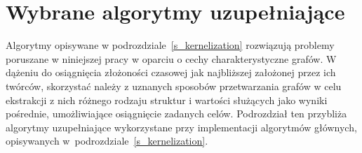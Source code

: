 \section{Wybrane algorytmy uzupełniające}\label{s_supplementary_algorithms}
\par{
  Algorytmy opisywane w podrozdziale~\ref{s_kernelization} rozwiązują problemy poruszane w niniejszej pracy w oparciu o cechy charakterystyczne grafów.
  W dążeniu do osiągnięcia złożoności czasowej jak najbliższej założonej przez ich twórców, skorzystać należy z uznanych sposobów przetwarzania grafów w celu ekstrakcji z nich różnego rodzaju struktur i wartości służących jako wyniki pośrednie, umożliwiające osiągnięcie zadanych celów.
  Podrozdział ten przybliża algorytmy uzupełniające wykorzystane przy implementacji algorytmów głównych, opisywanych w~podrozdziale~\ref{s_kernelization}.
}


